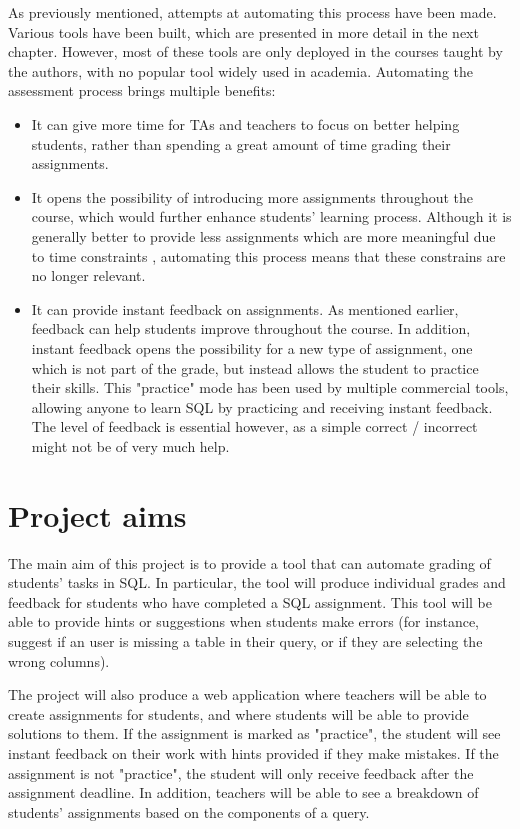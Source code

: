 As previously mentioned, attempts at automating this process have been made. Various tools have been built, which are presented in more detail in the next chapter. However, most of these tools are only deployed in the courses taught by the authors, with no popular tool widely used in academia. Automating the assessment process brings multiple benefits:
\begin{itemize}
    \item It can give more time for TAs and teachers to focus on better helping students, rather than spending a great amount of time grading their assignments.
    \item It opens the possibility of introducing more assignments throughout the course, which would further enhance students' learning process. Although it is generally better to provide less assignments which are more meaningful due to time constraints \citep{literature:assement}, automating this process means that these constrains are no longer relevant.
    \item It can provide instant feedback on assignments. As mentioned earlier, feedback can help students improve throughout the course. In addition, instant feedback opens the possibility for a new type of assignment, one which is not part of the grade, but instead allows the student to practice their skills. This "practice" mode has been used by multiple commercial tools, allowing anyone to learn SQL by practicing and receiving instant feedback. The level of feedback is essential however, as a simple correct / incorrect might not be of very much help.
\end{itemize}


\section{Project aims} \label{ch:introduction:sec:project_aims}

The main aim of this project is to provide a tool that can automate grading of students' tasks in SQL. In particular, the tool will produce individual grades and feedback for students who have completed a SQL assignment. This tool will be able to provide hints or suggestions when students make errors (for instance, suggest if an user is missing a table in their query, or if they are selecting the wrong columns).

The project will also produce a web application where teachers will be able to create assignments for students, and where students will be able to provide solutions to them. If the assignment is marked as "practice", the student will see instant feedback on their work with hints provided if they make mistakes. If the assignment is not "practice", the student will only receive feedback after the assignment deadline. In addition, teachers will be able to see a breakdown of students' assignments based on the components of a query.

